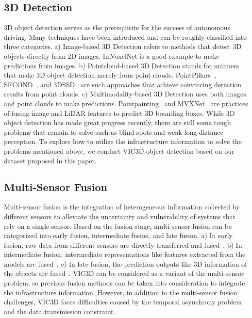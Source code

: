 \subsection{3D Detection}
3D object detection serves as the prerequisite for the success of autonomous driving. Many techniques have been introduced and can be roughly classified into three categories. a) Image-based 3D Detection refers to methods that detect 3D objects directly from 2D images. ImVoxelNet\cite{rukhovich2021imvoxelnet} is a good example to make predictions from images. 
b) Pointcloud-based 3D Detection stands for manners that make 3D object detection merely from point clouds. PointPillars~\cite{lang2019pointpillars}, SECOND~\cite{yan2018second}, and 3DSSD~\cite{Yang2020ssd} are such approaches that achieve convincing detection results from point clouds. 
c) Multimodality-based 3D Detection uses both images and point clouds to make predictions. Pointpainting~\cite{Vora2020Point} and MVXNet~\cite{Sindagi2019MVX} are practices of fusing image and LiDAR features to predict 3D bounding boxes.
While 3D object detection has made great progress recently, there are still some tough problems that remain to solve such as blind spots and weak  long-distance perception. 
To explore how to utilize the infrastructure information to solve the problems mentioned above, 
we conduct VIC3D object detection based on our dataset proposed in this paper.

\subsection{Multi-Sensor Fusion}

Multi-sensor fusion\cite{Wang2020Multi} is the integration of heterogeneous information collected by different sensors to alleviate the uncertainty and vulnerability of systems that rely on a single sensor.
Based on the fusion stage, multi-sensor fusion can be categorized into early fusion, intermediate fusion, and late fusion. a) In early fusion, raw data from different sensors are directly transferred and fused~\cite{gao2018early}. b) In intermediate fusion, intermediate representations like features extracted from the models are fused~\cite{Chen2017Multi, Sindagi2019MVX}. c) In late fusion, the prediction outputs like 3D information of the objects are fused~\cite{hag2018late}. 
VIC3D can be considered as a variant of the multi-sensor problem, so previous fusion methods can be taken into consideration to integrate the infrastructure information.
However, in addition to the multi-sensor fusion challenges, VIC3D faces difficulties caused by the temporal asynchrony problem and the data transmission constraint.

